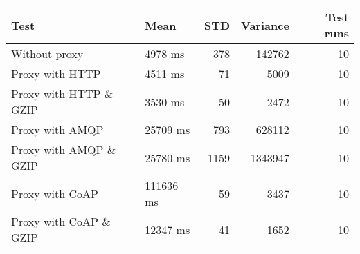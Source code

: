 \begin{tabularx}{\textwidth}{llrrr}
\hline
 Test                   & Mean      &   STD &   Variance &   Test runs \\
\hline
 Without proxy          & 4978 ms   &   378 &     142762 &          10 \\
 Proxy with HTTP        & 4511 ms   &    71 &       5009 &          10 \\
 Proxy with HTTP \& GZIP & 3530 ms   &    50 &       2472 &          10 \\
 Proxy with AMQP        & 25709 ms  &   793 &     628112 &          10 \\
 Proxy with AMQP \& GZIP & 25780 ms  &  1159 &    1343947 &          10 \\
 Proxy with CoAP        & 111636 ms &    59 &       3437 &          10 \\
 Proxy with CoAP \& GZIP & 12347 ms  &    41 &       1652 &          10 \\
\hline
\end{tabularx}